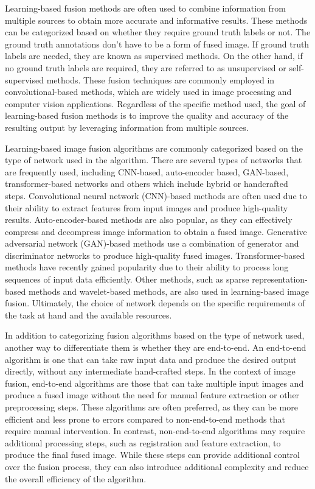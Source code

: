 Learning-based fusion methods are often used to combine information from multiple sources to obtain more accurate and informative results. These methods can be categorized based on whether they require ground truth labels or not. The ground truth annotations don't have to be a form of fused image. If ground truth labels are needed, they are known as supervised methods. On the other hand, if no ground truth labels are required, they are referred to as unsupervised or self-supervised methods. These fusion techniques are commonly employed in convolutional-based methods, which are widely used in image processing and computer vision applications. Regardless of the specific method used, the goal of learning-based fusion methods is to improve the quality and accuracy of the resulting output by leveraging information from multiple sources.

Learning-based image fusion algorithms are commonly categorized based on the type of network used in the algorithm. There are several types of networks that are frequently used, including CNN-based, auto-encoder based, GAN-based, transformer-based networks and others which include hybrid or handcrafted steps. Convolutional neural network (CNN)-based methods are often used due to their ability to extract features from input images and produce high-quality results. Auto-encoder-based methods are also popular, as they can effectively compress and decompress image information to obtain a fused image. Generative adversarial network (GAN)-based methods use a combination of generator and discriminator networks to produce high-quality fused images. Transformer-based methods have recently gained popularity due to their ability to process long sequences of input data efficiently. Other methods, such as sparse representation-based methods and wavelet-based methods, are also used in learning-based image fusion. Ultimately, the choice of network depends on the specific requirements of the task at hand and the available resources.

In addition to categorizing fusion algorithms based on the type of network used, another way to differentiate them is whether they are end-to-end. An end-to-end algorithm is one that can take raw input data and produce the desired output directly, without any intermediate hand-crafted steps. In the context of image fusion, end-to-end algorithms are those that can take multiple input images and produce a fused image without the need for manual feature extraction or other preprocessing steps. These algorithms are often preferred, as they can be more efficient and less prone to errors compared to non-end-to-end methods that require manual intervention. In contrast, non-end-to-end algorithms may require additional processing steps, such as registration and feature extraction, to produce the final fused image. While these steps can provide additional control over the fusion process, they can also introduce additional complexity and reduce the overall efficiency of the algorithm.

